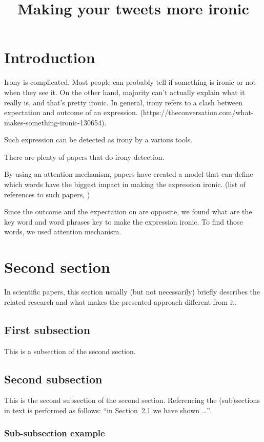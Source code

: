 \documentclass[10pt, a4paper]{article}
\title{Making your tweets more ironic}
\begin{document}
\maketitleabstract

\section{Introduction}

Irony is complicated. Most people can probably tell if something is ironic or not when they see it. On the other hand, majority can't actually explain what it really is, and that's pretty ironic. In general, irony refers to a clash between expectation and outcome of an expression. (https://theconversation.com/what-makes-something-ironic-130654). 

Such expression can be detected as irony by a various tools.

There are plenty of papers that do irony detection.

By using an attention mechanism, papers have created a model that can define which words have the biggest impact in making the expression ironic. (list of references to such papers, )

Since the outcome and the expectation on are opposite, we found what are the key word and word phrases key to make the expression ironic. To find those words, we used attention mechanism.

\section{Second section}

In scientific papers, this section usually (but not necessarily) briefly describes the related research and what makes the presented approach different from it.

\subsection{First subsection}
\label{sec:first}

This is a subsection of the second section.

\subsection{Second subsection}

This is the second subsection of the second section. Referencing the (sub)sections in text is performed as follows: ``in Section~\ref{sec:first} we have shown \dots''.

\subsubsection{Sub-subsection example} 
\end{document}
